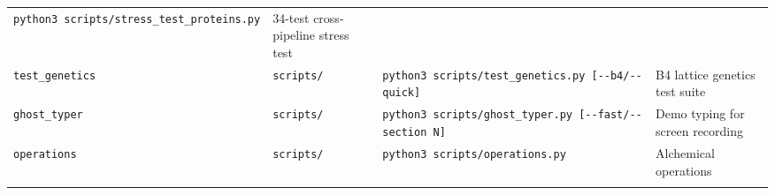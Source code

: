 \documentclass[12pt,a4paper]{article}
\begin{document}
\begin{longtable}[]{@{}llll@{}}
\begin{minipage}[t]{0.19\columnwidth}
\texttt{python3\ scripts/stress\_test\_proteins.py}\strut
\end{minipage} & \begin{minipage}[t]{0.28\columnwidth}\raggedright
34-test cross-pipeline stress test\strut
\end{minipage}\tabularnewline
\begin{minipage}[t]{0.17\columnwidth}\raggedright
\texttt{test\_genetics}\strut
\end{minipage} & \begin{minipage}[t]{0.24\columnwidth}\raggedright
\texttt{scripts/}\strut
\end{minipage} & \begin{minipage}[t]{0.19\columnwidth}\raggedright
\texttt{python3\ scripts/test\_genetics.py\ {[}-\/-b4/-\/-quick{]}}\strut
\end{minipage} & \begin{minipage}[t]{0.28\columnwidth}\raggedright
B4 lattice genetics test suite\strut
\end{minipage}\tabularnewline
\begin{minipage}[t]{0.17\columnwidth}\raggedright
\texttt{ghost\_typer}\strut
\end{minipage} & \begin{minipage}[t]{0.24\columnwidth}\raggedright
\texttt{scripts/}\strut
\end{minipage} & \begin{minipage}[t]{0.19\columnwidth}\raggedright
\texttt{python3\ scripts/ghost\_typer.py\ {[}-\/-fast/-\/-section\ N{]}}\strut
\end{minipage} & \begin{minipage}[t]{0.28\columnwidth}\raggedright
Demo typing for screen recording\strut
\end{minipage}\tabularnewline
\begin{minipage}[t]{0.17\columnwidth}\raggedright
\texttt{operations}\strut
\end{minipage} & \begin{minipage}[t]{0.24\columnwidth}\raggedright
\texttt{scripts/}\strut
\end{minipage} & \begin{minipage}[t]{0.19\columnwidth}\raggedright
\texttt{python3\ scripts/operations.py}\strut
\end{minipage} & \begin{minipage}[t]{0.28\columnwidth}\raggedright
Alchemical operations\strut
\end{minipage}\tabularnewline
\begin{minipage}[t]{0.17\columnwidth}\raggedright

\end{minipage}
\end{longtable}
\end{document}
